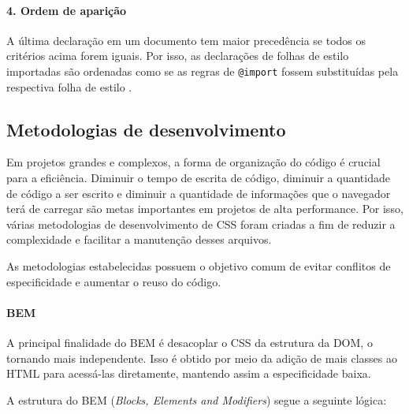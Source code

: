 \hypertarget{ordem-de-apariuxe7uxe3o}{%
\paragraph{4. Ordem de aparição}\label{ordem-de-apariuxe7uxe3o}}

A última declaração em um documento tem maior precedência se todos os
critérios acima forem iguais. Por isso, as declarações de folhas de
estilo importadas são ordenadas como se as regras de \texttt{@import}
fossem substituídas pela respectiva folha de estilo .

\hypertarget{metodologias-de-desenvolvimento}{%
\subsection{Metodologias de
desenvolvimento}\label{metodologias-de-desenvolvimento}}

Em projetos grandes e complexos, a forma de organização do código é
crucial para a eficiência. Diminuir o tempo de escrita de código,
diminuir a quantidade de código a ser escrito e diminuir a quantidade de
informações que o navegador terá de carregar são metas importantes em
projetos de alta performance. Por isso, várias metodologias de
desenvolvimento de CSS foram criadas a fim de reduzir a complexidade e
facilitar a manutenção desses arquivos.

As metodologias estabelecidas possuem o objetivo comum de evitar
conflitos de especificidade e aumentar o reuso do código.

\hypertarget{bem}{%
\paragraph{BEM}\label{bem}}

A principal finalidade do BEM é desacoplar o CSS da estrutura da DOM, o
tornando mais independente. Isso é obtido por meio da adição de mais
classes ao HTML para acessá-las diretamente, mantendo assim a
especificidade baixa.\nocite{bem}

A estrutura do BEM (\emph{Blocks, Elements and Modifiers}) segue a
seguinte lógica:

